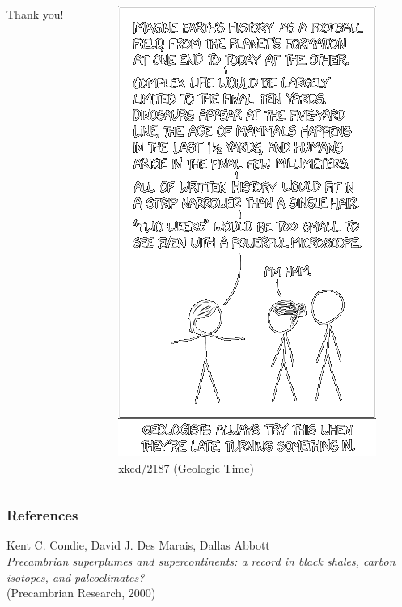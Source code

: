 \documentclass{beamer}
\begin{document}
        \begin{frame}[standout]
        \begin{columns}
                \begin{column}{0.5\textwidth}
                \centering
                Thank you!
                \end{column}

                \begin{column}{0.5\textwidth}
                \vspace{1cm}
                \begin{figure}
                \begin{center}
                        \includegraphics[scale=0.40]{geologic_time.png}
                \end{center}
                \caption{xkcd/2187 (Geologic Time)}
                \end{figure}
                \vspace*{\fill}
                \end{column}
        \end{columns}
        \end{frame}
        
        \appendix
        \begin{frame}
                \frametitle{References}
                Kent C. Condie, David J. Des Marais, Dallas Abbott\\
                \emph{Precambrian superplumes and supercontinents: a record in black shales, carbon isotopes, and paleoclimates?}\\
                (Precambrian Research, 2000)
        \end{frame}
\end{document}
